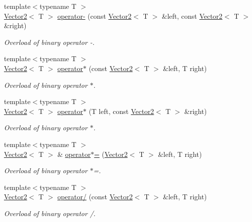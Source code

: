 \begin{DoxyCompactItemize}
{\footnotesize template$<$typename T $>$ }\\\hyperlink{classsf_1_1Vector2}{Vector2}$<$ T $>$ \hyperlink{classsf_1_1Vector2_ad027adae53ec547a86c20deeb05c9e85}{operator-\/} (const \hyperlink{classsf_1_1Vector2}{Vector2}$<$ T $>$ \&left, const \hyperlink{classsf_1_1Vector2}{Vector2}$<$ T $>$ \&right)
\begin{DoxyCompactList}\small\item\em Overload of binary operator -\/. \end{DoxyCompactList}\item 
{\footnotesize template$<$typename T $>$ }\\\hyperlink{classsf_1_1Vector2}{Vector2}$<$ T $>$ \hyperlink{classsf_1_1Vector2_a5f48ca928995b41c89f155afe8d16b02}{operator$\ast$} (const \hyperlink{classsf_1_1Vector2}{Vector2}$<$ T $>$ \&left, T right)
\begin{DoxyCompactList}\small\item\em Overload of binary operator $\ast$. \end{DoxyCompactList}\item 
{\footnotesize template$<$typename T $>$ }\\\hyperlink{classsf_1_1Vector2}{Vector2}$<$ T $>$ \hyperlink{classsf_1_1Vector2_ad8b3e1cf7b156a984bc1427539ca8605}{operator$\ast$} (T left, const \hyperlink{classsf_1_1Vector2}{Vector2}$<$ T $>$ \&right)
\begin{DoxyCompactList}\small\item\em Overload of binary operator $\ast$. \end{DoxyCompactList}\item 
{\footnotesize template$<$typename T $>$ }\\\hyperlink{classsf_1_1Vector2}{Vector2}$<$ T $>$ \& \hyperlink{classsf_1_1Vector2_abea24cb28c0d6e2957e259ba4e65d70e}{operator$\ast$=} (\hyperlink{classsf_1_1Vector2}{Vector2}$<$ T $>$ \&left, T right)
\begin{DoxyCompactList}\small\item\em Overload of binary operator $\ast$=. \end{DoxyCompactList}\item 
{\footnotesize template$<$typename T $>$ }\\\hyperlink{classsf_1_1Vector2}{Vector2}$<$ T $>$ \hyperlink{classsf_1_1Vector2_a7409dd89cb3aad6c3bc6622311107311}{operator/} (const \hyperlink{classsf_1_1Vector2}{Vector2}$<$ T $>$ \&left, T right)
\begin{DoxyCompactList}\small\item\em Overload of binary operator /. \end{DoxyCompactList}\item 

\end{DoxyCompactItemize}
